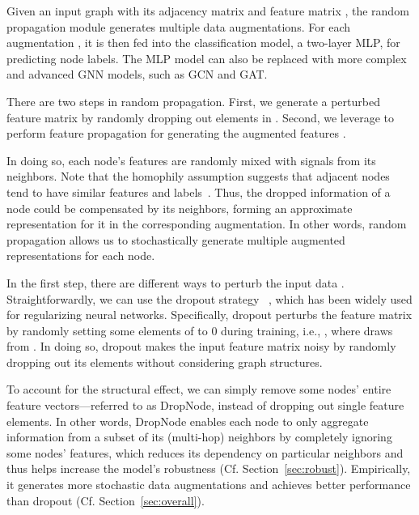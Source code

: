 Given an input graph  with its adjacency matrix  and feature matrix , the random propagation module generates multiple data augmentations. 
For each augmentation , it is then fed into the classification model, a two-layer MLP, for predicting node labels. 
The MLP model can also be replaced with more complex and advanced GNN models, such as GCN and GAT.







There are two steps in random propagation. 
First, we generate a perturbed feature matrix  by randomly dropping out elements in .  Second, we leverage  to perform feature propagation for generating the augmented features . 

In doing so, each node's features are randomly mixed with signals from its neighbors. Note that the homophily assumption suggests that adjacent nodes tend to have similar features and labels~\cite{mcpherson2001birds}. 
Thus, the dropped information of a node could be compensated by its neighbors, forming an approximate representation for it in the corresponding augmentation. In other words, random propagation allows us to stochastically generate multiple augmented representations for each node. 










In the first step, there are different ways to perturb the input data . 
Straightforwardly, we can use the dropout strategy ~\cite{srivastava2014dropout}, which has been widely used for regularizing neural networks. 
Specifically, dropout perturbs the feature matrix by randomly setting some elements of  to 0 during training, i.e., , where  draws from . 
In doing so, dropout makes the input feature matrix  noisy by randomly dropping out its elements without considering graph structures.



To account for the structural effect, we can simply remove some nodes' entire feature vectors---referred to as DropNode, instead of dropping out single feature elements. 
In other words, DropNode enables each node to only aggregate information from a subset of its (multi-hop) neighbors by completely ignoring some nodes' features, which reduces its dependency on particular neighbors and thus helps increase the model's robustness (Cf. Section~\ref{sec:robust}). 
Empirically, it generates more stochastic data augmentations and achieves better performance than dropout (Cf. Section~\ref{sec:overall}). 


